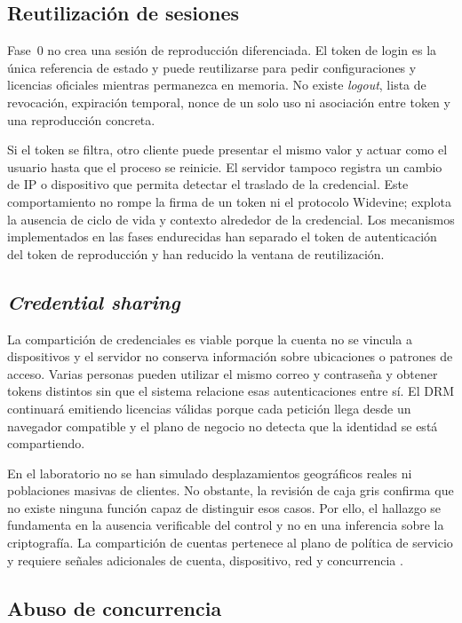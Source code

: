 \subsection{Reutilización de sesiones}

Fase~0 no crea una sesión de reproducción diferenciada. El token de login es la única referencia de estado y puede reutilizarse para pedir configuraciones y licencias oficiales mientras permanezca en memoria. No existe \textit{logout}, lista de revocación, expiración temporal, nonce de un solo uso ni asociación entre token y una reproducción concreta.

Si el token se filtra, otro cliente puede presentar el mismo valor y actuar como el usuario hasta que el proceso se reinicie. El servidor tampoco registra un cambio de IP o dispositivo que permita detectar el traslado de la credencial. Este comportamiento no rompe la firma de un token ni el protocolo Widevine; explota la ausencia de ciclo de vida y contexto alrededor de la credencial. Los mecanismos implementados en las fases endurecidas han separado el token de autenticación del token de reproducción y han reducido la ventana de reutilización.

\subsection{\textit{Credential sharing}}

La compartición de credenciales es viable porque la cuenta no se vincula a dispositivos y el servidor no conserva información sobre ubicaciones o patrones de acceso. Varias personas pueden utilizar el mismo correo y contraseña y obtener tokens distintos sin que el sistema relacione esas autenticaciones entre sí. El DRM continuará emitiendo licencias válidas porque cada petición llega desde un navegador compatible y el plano de negocio no detecta que la identidad se está compartiendo.

En el laboratorio no se han simulado desplazamientos geográficos reales ni poblaciones masivas de clientes. No obstante, la revisión de caja gris confirma que no existe ninguna función capaz de distinguir esos casos. Por ello, el hallazgo se fundamenta en la ausencia verificable del control y no en una inferencia sobre la criptografía. La compartición de cuentas pertenece al plano de política de servicio y requiere señales adicionales de cuenta, dispositivo, red y concurrencia \cite{deloitte2024,adobe2026}.

\subsection{Abuso de concurrencia}


